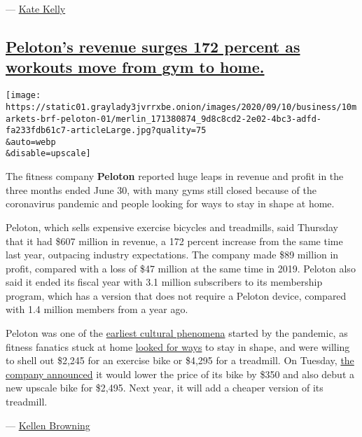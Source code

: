 --- \href{https://www.nytimes3xbfgragh.onion/by/kate-kelly}{Kate Kelly}

\hypertarget{pelotons-revenue-surges-172-percent-as-workouts-move-from-gym-to-home}{%
\subsection{\texorpdfstring{\protect\hyperlink{pelotons-revenue-surges-172-percent-as-workouts-move-from-gym-to-home}{Peloton's
revenue surges 172 percent as workouts move from gym to
home.}}{Peloton's revenue surges 172 percent as workouts move from gym to home.}}\label{pelotons-revenue-surges-172-percent-as-workouts-move-from-gym-to-home}}

\texttt{[image: https://static01.graylady3jvrrxbe.onion/images/2020/09/10/business/10markets-brf-peloton-01/merlin\_171380874\_9d8c8cd2-2e02-4bc3-adfd-fa233fdb61c7-articleLarge.jpg?quality=75\\\&auto=webp\\\&disable=upscale]}

The fitness company \textbf{Peloton} reported huge leaps in revenue and
profit in the three months ended June 30, with many gyms still closed
because of the coronavirus pandemic and people looking for ways to stay
in shape at home.

Peloton, which sells expensive exercise bicycles and treadmills, said
Thursday that it had \$607 million in revenue, a 172 percent increase
from the same time last year, outpacing industry expectations. The
company made \$89 million in profit, compared with a loss of \$47
million at the same time in 2019. Peloton also said it ended its fiscal
year with 3.1 million subscribers to its membership program, which has a
version that does not require a Peloton device, compared with 1.4
million members from a year ago.

Peloton was one of the
\href{https://www.nytimes3xbfgragh.onion/2020/03/12/style/coronavirus-fitness-gyms.html}{earliest
cultural phenomena} started by the pandemic, as fitness fanatics stuck
at home
\href{https://www.nytimes3xbfgragh.onion/2020/05/06/technology/peloton-boom-workout-virus.html}{looked
for ways} to stay in shape, and were willing to shell out \$2,245 for an
exercise bike or \$4,295 for a treadmill. On Tuesday,
\href{https://www.cnn.com/2020/09/08/tech/peloton-new-products/index.html}{the
company announced} it would lower the price of its bike by \$350 and
also debut a new upscale bike for \$2,495. Next year, it will add a
cheaper version of its treadmill.

--- \href{https://www.nytimes3xbfgragh.onion/by/kellen-browning}{Kellen
Browning}

